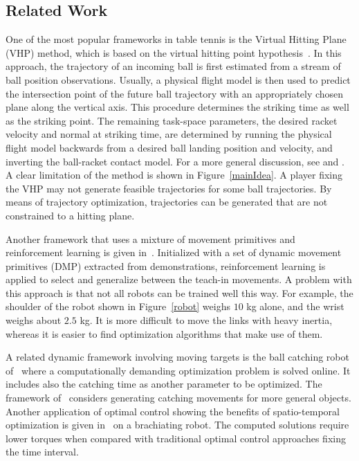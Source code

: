 \subsection{Related Work}\label{relatedWork}

One of the most popular frameworks in table tennis is the Virtual Hitting Plane (VHP) method, which is based on the virtual hitting point hypothesis~\citep{Ramanantsoa94}. In this approach, the trajectory of an incoming ball is first estimated from a stream of ball position observations. Usually, a physical flight model is then used to predict the intersection point of the future ball trajectory with an appropriately chosen plane along the vertical axis. This procedure determines the striking time as well as the striking point. The remaining task-space parameters, the desired racket velocity and normal at striking time, are determined by running the physical flight model backwards from a desired ball landing position and velocity, and inverting the ball-racket contact model. For a more general discussion, see \citet{Matsushima05} and \citet{Muelling11}. A clear limitation of the method is shown in Figure~\ref{mainIdea}. A player fixing the VHP may not generate feasible trajectories for some ball trajectories. By means of trajectory optimization, trajectories can be generated that are not constrained to a hitting plane.

Another framework that uses a mixture of movement primitives and reinforcement learning is given in~\citet{Muelling13}. Initialized with a set of dynamic movement primitives (DMP) extracted from demonstrations, reinforcement learning is applied to select and generalize between the teach-in movements. A problem with this approach is that not all robots can be trained well this way. For example, the shoulder of the robot shown in Figure~\ref{robot} weighs $10$ kg alone, and the wrist weighs about $2.5$ kg. It is more difficult to move the links with heavy inertia, whereas it is easier to find optimization algorithms that make use of them.


A related dynamic framework involving moving targets is the ball catching robot of~\citet{Baeuml11} where a computationally demanding optimization problem is solved online. It includes also the catching time as another parameter to be optimized. The framework of~\citet{Kim10} considers generating catching movements for more general objects. Another application of optimal control showing the benefits of spatio-temporal optimization is given in~\citet{Nakanishi2016} on a brachiating robot. The computed solutions require lower torques when compared with traditional optimal control approaches fixing the time interval. 

